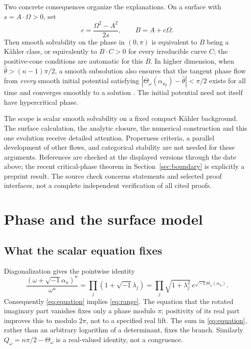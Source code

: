 \documentclass[12pt,reqno]{amsart}
\newcommand{\ii}{\sqrt{-1}}
\newcommand{\Th}{\Theta_\omega}
\newcommand{\hth}{\widehat\theta}
\begin{document}
Two concrete consequences organize the explanations. On a surface with $s=A\cdot\Omega>0$, set
\begin{equation}\label{eq:surface-data}
 c=\frac{\Omega^2-A^2}{2s},\qquad B=A+c\Omega.
\end{equation}
Then smooth solvability on the phase in $(0,\pi)$ is equivalent to $B$ being a K\"ahler class, or equivalently to $B\cdot C>0$ for every irreducible curve $C$; the positive-cone conditions are automatic for this $B$. In higher dimension, when $\hth>(n-1)\pi/2$, a smooth subsolution also ensures that the tangent phase flow from \emph{every} smooth initial potential satisfying $|\Th(\alpha_{u_0})-\hth|<\pi/2$ exists for all time and converges smoothly to a solution \cite[Theorem 1.4]{Tak}. The initial potential need not itself have hypercritical phase.

The scope is scalar smooth solvability on a fixed compact K\"ahler background. The surface calculation, the analytic closure, the numerical construction and this one evolution receive detailed attention. Properness criteria, a parallel development of other flows, and categorical stability are not needed for these arguments. References are checked at the displayed versions through the date above; the recent critical-phase theorem in Section~\ref{sec:boundary} is explicitly a preprint result. The source check concerns statements and selected proof interfaces, not a complete independent verification of all cited proofs.

\section{Phase and the surface model}\label{sec:surface}
\subsection{What the scalar equation fixes}
Diagonalization gives the pointwise identity
\begin{equation}\label{eq:det}
 \frac{(\omega+\ii\alpha_u)^n}{\omega^n}
   =\prod_j(1+\ii\lambda_j)
   =\prod_j\sqrt{1+\lambda_j^2}\,e^{\ii\Th(\alpha_u)}.
\end{equation}
Consequently \eqref{eq:equation} implies \eqref{eq:range}. The equation that the rotated imaginary part vanishes fixes only a phase modulo $\pi$; positivity of its real part improves this to modulo $2\pi$, not to a specified real lift. The sum in \eqref{eq:equation}, rather than an arbitrary logarithm of a determinant, fixes the branch. Similarly $Q_\omega=n\pi/2-\Th$ is a real-valued identity, not a congruence.
\end{document}
